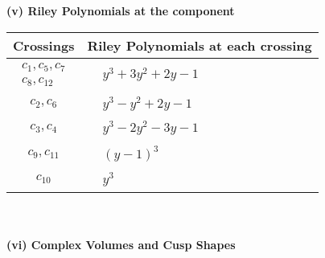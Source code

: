 \documentclass[1p]{elsarticle_modified}
\theoremstyle{definition}
\begin{document}
\newpage\renewcommand{\arraystretch}{1}
\flushleft \textbf{(v) Riley Polynomials at the component}\newline \\
\begin{tabular}{m{50pt}|m{274pt}}
Crossings & \hspace{64pt}Riley Polynomials at each crossing \\
\hline $$\begin{aligned}c_{1},c_{5},c_{7}\\c_{8},c_{12}\end{aligned}$$&$\begin{aligned}
&y^3+3 y^2+2 y-1
\end{aligned}$\\
\hline $$\begin{aligned}c_{2},c_{6}\end{aligned}$$&$\begin{aligned}
&y^3- y^2+2 y-1
\end{aligned}$\\
\hline $$\begin{aligned}c_{3},c_{4}\end{aligned}$$&$\begin{aligned}
&y^3-2 y^2-3 y-1
\end{aligned}$\\
\hline $$\begin{aligned}c_{9},c_{11}\end{aligned}$$&$\begin{aligned}
&(y-1)^3
\end{aligned}$\\
\hline $$\begin{aligned}c_{10}\end{aligned}$$&$\begin{aligned}
&y^3
\end{aligned}$\\
\hline
\end{tabular}\\~\\
\newpage\flushleft \textbf{(vi) Complex Volumes and Cusp Shapes}
\end{document}
